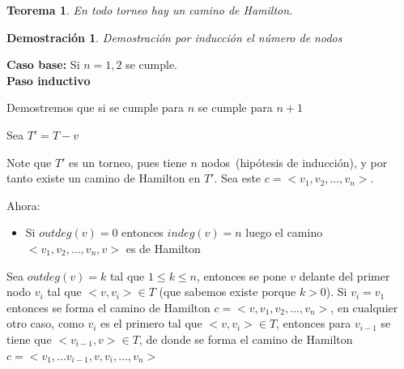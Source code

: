 \documentclass[a4paper,1pt]{report}
\newtheorem*{teo}{Teorema}
\newtheorem*{dem}{Demostración}
\begin{document}
\begin{teo}
 En todo torneo hay un camino de Hamilton.
\end{teo}

\begin{dem}
 Demostración por inducción el número de nodos
\end{dem}

\textbf{Caso base:} Si $n=1,2$ se cumple.\\

\textbf{Paso inductivo}

Demostremos que si se cumple para $n$ se cumple para $n+1$

Sea $T'=T-{v}$

Note que $T'$ es un torneo, pues tiene $n$ nodos~(hipótesis de inducción), y por tanto existe un camino de Hamilton en $T'$. Sea este $c=<v_1,v_2,\dots,v_n>$.

Ahora:
\begin{itemize}
 \item Si $outdeg(v)=0$ entonces $indeg(v)=n$ luego el camino $<v_1,v_2,\dots,v_n,v>$ es de Hamilton
\end{itemize}

Sea $outdeg(v)=k$ tal que $1 \leq k \leq n$, entonces se pone $v$ delante del primer nodo $v_i$ tal que $<v, v_i> \in T$ (que sabemos existe porque $k > 0$).
Si $v_i = v_1$ entonces se forma el camino de Hamilton $c =<v, v_1,v_2,...,v_n>$, en cualquier otro caso, como $v_i$ es el primero tal que $<v, v_i> \in T$, entonces para $v_{i-1}$ se tiene que $<v_{i-1}, v> \in T$, de donde se forma el camino de Hamilton 
$c = <v_1,...v_{i-1}, v, v_i, ..., v_n>$
\end{document}
